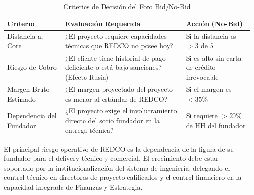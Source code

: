 \begin{table}[htbp]
\centering
\caption{Criterios de Decisión del Foro Bid/No-Bid}
\begin{tabular}{@{}p{3cm}p{6cm}p{3cm}@{}}
\toprule
\textbf{Criterio} & \textbf{Evaluación Requerida} & \textbf{Acción (No-Bid)} \\
\midrule
Distancia al Core & ¿El proyecto requiere capacidades técnicas que REDCO no posee hoy? & Si la distancia es $>3$ de 5 \\
\rowcolor{tablealt} Riesgo de Cobro & ¿El cliente tiene historial de pago deficiente o está bajo sanciones? (Efecto Rusia) & Si es alto sin carta de crédito irrevocable \\
Margen Bruto Estimado & ¿El margen proyectado del proyecto es menor al estándar de REDCO? & Si el margen es $<35\%$ \\
\rowcolor{tablealt} Dependencia del Fundador & ¿El proyecto exige el involucramiento directo del socio fundador en la entrega técnica? & Si requiere $>20\%$ de HH del fundador \\
\bottomrule
\end{tabular}
\label{tab:bid_nobid}
\end{table}

\begin{keyinsightbox}
El principal riesgo operativo de REDCO es la dependencia de la figura de su fundador para el delivery técnico y comercial. El crecimiento debe estar soportado por la institucionalización del sistema de ingeniería, delegando el control técnico en directores de proyecto calificados y el control financiero en la capacidad integrada de Finanzas y Estrategia.
\end{keyinsightbox}
